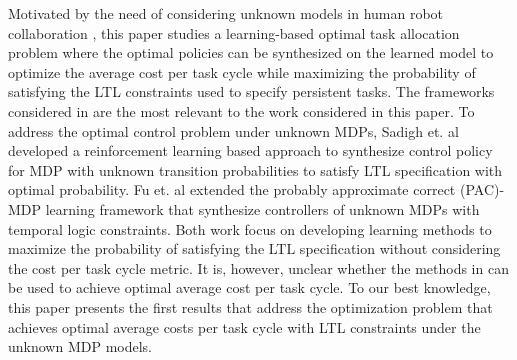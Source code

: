\documentclass[journal]{IEEEtran}
\begin{document}
Motivated by the need of considering unknown  models in human robot collaboration , this paper studies a learning-based optimal task allocation problem where the optimal policies can be synthesized on the learned model  to optimize the average cost per task cycle while maximizing the probability of satisfying the LTL constraints used to specify persistent tasks. The frameworks considered in \cite{sadigh2014learning,Fu-RSS-14} are the most relevant to the work considered in this paper. To address the optimal control problem under unknown MDPs, Sadigh et. al \cite{sadigh2014learning} developed a reinforcement learning based approach to synthesize control policy for MDP with unknown transition probabilities to satisfy LTL specification with optimal probability. Fu et. al \cite{Fu-RSS-14} extended the probably approximate correct (PAC)-MDP learning framework that synthesize controllers of unknown MDPs with temporal logic constraints. Both work focus on developing learning methods to maximize the probability of satisfying the LTL specification without considering the cost per task cycle metric. It is, however, unclear whether the methods in \cite{sadigh2014learning,Fu-RSS-14} can be used to achieve optimal average cost per task cycle. To our best knowledge, this paper presents the first results that address the optimization problem that achieves optimal average costs per task cycle with LTL constraints under the unknown MDP models. 
\end{document}
